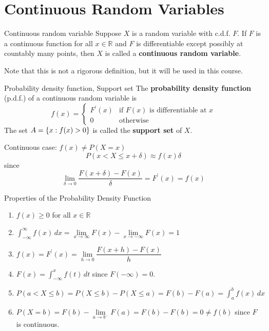 \section{Continuous Random Variables}
\begin{Definition}{Continuous random variable}{}
    Suppose $ X $ is a random variable with c.d.f. $ F $. If $ F $
    is a continuous function for all $ x\in\mathbb{R} $ and
    $ F $ is differentiable except possibly at
    countably many points, then $ X $ is called a
    \textbf{continuous random variable}.
\end{Definition}
Note that this is not a rigorous definition, but it will be
used in this course.

\begin{Definition}{Probability density function, Support set}{}
    The \textbf{probability density function} (p.d.f.) of a continuous random variable
    is
    \[ f(x)=\begin{cases}
            F^\prime(x) & \text{if }F(x)\text{ is differentiable at }x \\
            0           & \text{otherwise}
        \end{cases} \]
    The set $ A=\{x:f(x)>0\} $ is called the \textbf{support set}
    of $ X $.
\end{Definition}

Continuous case: $ f(x)\neq P(X=x) $
\[ P(x<X\leqslant x+\delta)\approx f(x)\delta \]
since
\[ \lim\limits_{{\delta} \to {0}}\frac{F(x+\delta)-F(x)}{\delta}=F^\prime(x)=f(x) \]
\begin{Definition}{Properties of the Probability Density Function}{}
    \begin{enumerate}[label=(\Roman*)]
        \item $ f(x)\geqslant 0 $ for all $ x\in\mathbb{R} $
        \item $ \displaystyle \int_{-\infty}^{\infty} f(x)\, d{x} =
                  \lim\limits_{{x} \to {\infty}} F(x)-
                  \lim\limits_{{x} \to {-\infty}} F(x)= 1 $
        \item $ f(x)=F^\prime(x)=
                  \lim\limits_{{h} \to {0}} \dfrac{F(x+h)-F(x)}{h} $
        \item $ F(x)=\displaystyle \int_{-\infty}^{x} f(t)\, d{t} $
              since $ F(-\infty)=0 $.
        \item $ P(a< X\leqslant b)=P(X\leqslant b)-
                  P(X\leqslant a)=F(b)-F(a)
                  =\displaystyle \int_{a}^{b} f(x)\, d{x}  $
        \item $ P(X=b)=F(b)-\lim\limits_{{a} \to {b^-}}
                  F(a)=F(b)-F(b) =0\neq f(b) $ since $ F $ is continuous.
    \end{enumerate}
\end{Definition}

